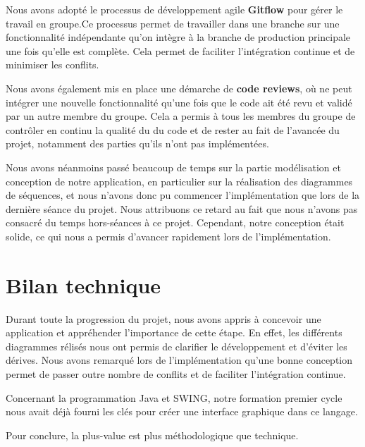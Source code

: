Nous avons adopté le processus de développement agile \textbf{Gitflow} pour gérer le travail en groupe.Ce processus permet de travailler dans une branche sur une fonctionnalité indépendante qu'on intègre à la branche de production principale une fois qu'elle est complète. Cela permet de faciliter l'intégration continue et de minimiser les conflits.

Nous avons également mis en place une démarche de \textbf{code reviews}, où ne peut intégrer une nouvelle fonctionnalité qu'une fois que le code ait été revu et validé par un autre membre du groupe. Cela a permis à tous les membres du groupe de contrôler en continu la qualité du du code et de rester au fait de l'avancée du projet, notamment des parties qu'ils n'ont pas implémentées.

Nous avons néanmoins passé beaucoup de temps sur la partie modélisation et conception de notre application, en particulier sur la réalisation des diagrammes de séquences, et nous n'avons donc pu commencer l'implémentation que lors de la dernière séance du projet. Nous attribuons ce retard au fait que nous n'avons pas consacré du temps hors-séances à ce projet. Cependant, notre conception était solide, ce qui nous a permis d'avancer rapidement lors de l'implémentation.  

\section{Bilan technique}

Durant toute la progression du projet, nous avons appris à concevoir une application et appréhender l’importance de cette étape. En effet, les différents diagrammes rélisés nous ont permis de clarifier le développement et d’éviter les dérives. Nous avons remarqué lors de l’implémentation qu’une bonne conception permet de passer outre nombre de conflits et de faciliter l’intégration continue.

Concernant la programmation Java et SWING, notre formation premier cycle nous avait déjà fourni les clés pour créer une interface graphique dans ce langage. 

Pour conclure, la plus-value est plus méthodologique que technique.

